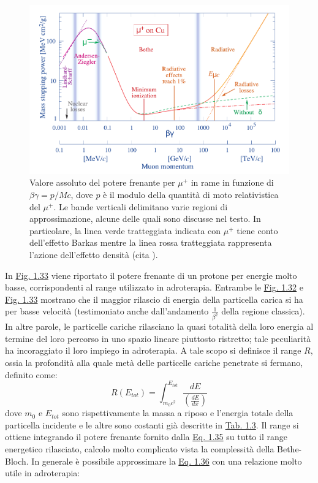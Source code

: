 \documentclass[12pt,a4paper,twoside]{report}
\begin{document}
\begin{figure}[H]
		\centering
		\includegraphics[width=0.9\linewidth]{bethe_bloch.pdf}
		\caption{Valore assoluto del potere frenante per $\mu^+$ in rame in funzione di $\beta\gamma=p/Mc$, dove $p$ è il modulo della quantità di moto relativistica del $\mu^+$. Le bande verticali delimitano varie regioni di approssimazione, alcune delle quali sono discusse nel testo. In particolare, la linea verde tratteggiata indicata con $\mu^+$ tiene conto dell'effetto Barkas mentre la linea rossa tratteggiata rappresenta l'azione dell'effetto densità (cita
			).}
		\label{fig:bethe_bloch}
	\end{figure}
	In \hyperref[fig:adroterapic_range]{Fig. 1.33} viene riportato il potere frenante di un protone per energie molto basse, corrispondenti al range utilizzato in adroterapia. Entrambe le \hyperref[fig:bethe_bloch]{Fig. 1.32} e \hyperref[fig:adroterapic_range]{Fig. 1.33} mostrano che il maggior rilascio di energia della particella carica si ha per basse velocità (testimoniato anche dall'andamento $\frac{1}{\beta^2}$ della regione classica). In altre parole, le particelle cariche rilasciano la quasi totalità della loro energia al termine del loro percorso in uno spazio lineare piuttosto ristretto; tale peculiarità ha incoraggiato il loro impiego in adroterapia. A tale scopo si definisce il range $R$, ossia la profondità alla quale metà delle particelle cariche penetrate si fermano, definito come:
	\begin{equation}
		R(E_{tot})=\int_{m_0c^2}^{E_{tot}}\frac{dE}{\left(\frac{dE}{dx}\right)}
		\label{eq:range}
	\end{equation}
	dove $m_0$ e $E_{tot}$ sono rispettivamente la massa a riposo e l'energia totale della particella incidente e le altre sono costanti già descritte in \hyperref[tab:bethe_bloch]{Tab. 1.3}. Il range si ottiene integrando il potere frenante fornito dalla \hyperref[eq:bethe_bloch]{Eq. 1.35} su tutto il range energetico rilasciato, calcolo molto complicato vista la complessità della Bethe-Bloch. In generale è possibile approssimare la \hyperref[eq:range]{Eq. 1.36} con una relazione molto utile in adroterapia:
\end{document}
